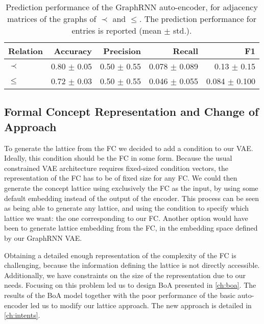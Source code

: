\begin{table}
\centering
\begin{tabular}{lrrrr}
\toprule
Relation & Accuracy & Precision &   Recall &       F1\\
       \midrule
$\prec$ & 0.80 $\pm$ 0.05 &  0.50 $\pm$ 0.55 & 0.078 $\pm$ 0.089 & 0.13 $\pm$ 0.15\\
$\leq$  & 0.72 $\pm$ 0.03 &  0.50 $\pm$ 0.55 & 0.046 $\pm$ 0.055 & 0.084 $\pm$ 0.100\\
\bottomrule
\end{tabular}
\caption[Prediction performance of the GraphRNN VAE on the development set, for the adjacency matrices of the graphs of $\prec$ and $\leq$.]{Prediction performance of the GraphRNN auto-encoder, for adjacency matrices of the graphs of $\prec$ and $\leq$. The prediction performance for entries is reported (mean $\pm$ std.).}
\label{tab:graphrnn-perf}
\end{table}

\subsection{Formal Concept Representation and Change of Approach}
To generate the lattice from the FC we decided to add a condition to our VAE.
Ideally, this condition should be the FC in some form. Because the usual constrained VAE architecture requires fixed-sized condition vectors, the representation of the FC has to be of fixed size for any FC.
We could then generate the concept lattice using exclusively the FC as the input, by using some default embedding instead of the output of the encoder.
This process can be seen as being able to generate any lattice, and using the condition to specify which lattice we want: the one corresponding to our FC.
Another option would have been to generate lattice embedding from the FC, in the embedding space defined by our GraphRNN VAE.

Obtaining a detailed enough representation of the complexity of the FC is challenging, because the information defining the lattice is not directly accessible.
Additionally, we have constraints on the size of the representation due to our needs.
Focusing on this problem led us to design BoA presented in \cref{ch:boa}.
The results of the BoA model together with the poor performance of the basic auto-encoder led us to modify our lattice approach.
The new approach is detailed in \cref{ch:intents}.
